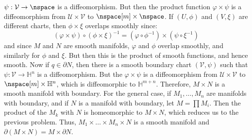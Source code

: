 \begin{solution}
            $\psi:\mathcal{V}\rightarrow\nspace$ is a diffeomorphism. But then
            the product function $\varphi\times\psi$ is a diffeomorphism from
            $\mathcal{U}\times\mathcal{V}$ to $\nspace[m]\times\nspace$. If
            $(U,\phi)$ and $(V,\xi)$ are different charts, then
            $\phi\times\xi$ overlaps smoothly since:
            \begin{equation}
                (\varphi\times\psi)\circ(\phi\times\xi)^{\minus{1}}
                =(\varphi\circ\phi^{\minus{1}})\times(\psi\circ\xi^{\minus{1}})
            \end{equation}
            and since $M$ and $N$ are smooth manifolds, $\varphi$ and $\phi$
            overlap smoothly, and similarly for $\phi$ and $\xi$. But then this
            is the product of smooth functions, and hence smooth. Now if
            $q\in\partial{N}$, then there is a smooth boundary chart
            $(\mathcal{V},\psi)$ such that
            $\psi:\mathcal{V}\rightarrow\mathbb{H}^{n}$ is a diffeomorphism.
            But the $\varphi\times\psi$ is a diffeomorphism from
            $\mathcal{U}\times\mathcal{V}$ to
            $\nspace[m]\times\mathbb{H}^{n}$, which is diffeomorphic to
            $\mathbb{H}^{m+n}$. Therefore, $M\times{N}$ is a smooth manifold
            with boundary. For the general case, if $M_{1},\dots,M_{n}$ are
            manifolds with boundary, and if $N$ is a manifold with boundary,
            let $M=\prod{M}_{i}$. Then the product of the $M_{k}$ with $N$ is
            homeomorphic to $M\times{N}$, which reduces us to the previous
            problem. Thus, $M_{1}\times\dots\times{M}_{n}\times{N}$ is a smooth
            manifold and $\partial(M\times{N})=M\times\partial{N}$.
        \end{solution}
